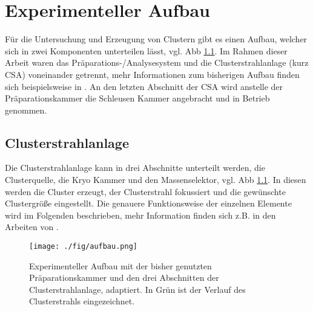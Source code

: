 \chapter{Experimenteller Aufbau}
Für die Untersuchung und Erzeugung von Clustern gibt es einen Aufbau, welcher sich in zwei Komponenten unterteilen lässt, vgl. Abb \ref{fig:csaaufbau}.
Im Rahmen dieser Arbeit waren das Präparations-/Analysesystem und die Clusterstrahlanlage (kurz CSA) voneinander getrennt, mehr Informationen zum bisherigen Aufbau finden sich beispielsweise in \cite{wolter}.
An den letzten Abschnitt der CSA wird anstelle der Präparationskammer die Schleusen Kammer angebracht und in Betrieb genommen.

\section{Clusterstrahlanlage}
Die Clusterstrahlanlage kann in drei Abschnitte unterteilt werden, die Clusterquelle, die Kryo Kammer und den Massenselektor, vgl. Abb \ref{fig:csaaufbau}.
In diesen werden die Cluster erzeugt, der Clusterstrahl fokussiert und die gewünschte Clustergröße eingestellt.
Die genauere Funktionsweise der einzelnen Elemente wird im Folgenden beschrieben, mehr Information finden sich z.B. in den Arbeiten von \cite{duffe, schröder, wolter}.
\begin{figure}
    \centering
    \texttt{[image: ./fig/aufbau.png]}
    \caption{Experimenteller Aufbau mit der bisher genutzten Präparationskammer und den drei Abschnitten der Clusterstrahlanlage, \cite{wolter} adaptiert. 
    In Grün ist der Verlauf des Clusterstrahls eingezeichnet.}
    \label{fig:csaaufbau}
\end{figure}
